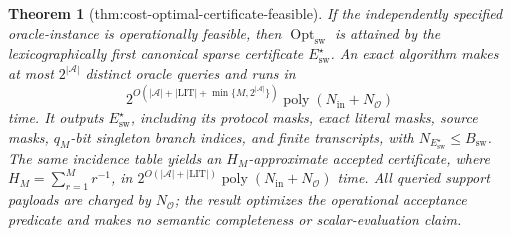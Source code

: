 \documentclass{article}
\newtheorem{theorem}{Theorem}
\begin{document}
\begin{theorem}[thm:cost-optimal-certificate-feasible]\label{thm:cost-optimal-certificate-feasible}
If the independently specified oracle-instance is operationally feasible, then \(\operatorname{Opt}_{\mathrm{sw}}\) is attained by the lexicographically first canonical sparse certificate \(E_{\mathrm{sw}}^{\star}\).  An exact algorithm makes at most \(2^{|\mathcal A|}\) distinct oracle queries and runs in
\[
 2^{O(|\mathcal A|+|\mathrm{LIT}|+\min\{M,2^{|\mathcal A|}\})}
 \operatorname{poly}(N_{\mathrm{in}}+N_{\mathcal O})
\]
time.  It outputs \(E_{\mathrm{sw}}^{\star}\), including its protocol masks, exact literal masks, source masks, \(q_M\)-bit singleton branch indices, and finite transcripts, with \(N_{E_{\mathrm{sw}}^{\star}}\leq B_{\mathrm{sw}}\).  The same incidence table yields an \(H_M\)-approximate accepted certificate, where \(H_M=\sum_{r=1}^{M}r^{-1}\), in \(2^{O(|\mathcal A|+|\mathrm{LIT}|)}\operatorname{poly}(N_{\mathrm{in}}+N_{\mathcal O})\) time.  All queried support payloads are charged by \(N_{\mathcal O}\); the result optimizes the operational acceptance predicate and makes no semantic completeness or scalar-evaluation claim.

\end{theorem}
\end{document}
